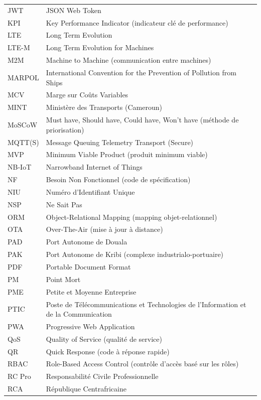 \begin{longtable}{@{}p{3.2cm}p{11.4cm}@{}}
	JWT & JSON Web Token \\
	KPI & Key Performance Indicator (indicateur clé de performance) \\
	LTE & Long Term Evolution \\
	LTE-M & Long Term Evolution for Machines \\
	M2M & Machine to Machine (communication entre machines) \\
	MARPOL & International Convention for the Prevention of Pollution from Ships \\
	MCV & Marge sur Coûts Variables \\
	MINT & Ministère des Transports (Cameroun) \\
	MoSCoW & Must have, Should have, Could have, Won't have (méthode de priorisation) \\
	MQTT(S) & Message Queuing Telemetry Transport (Secure) \\
	MVP & Minimum Viable Product (produit minimum viable) \\
	NB-IoT & Narrowband Internet of Things \\
	NF & Besoin Non Fonctionnel (code de spécification) \\
	NIU & Numéro d'Identifiant Unique \\
	NSP & Ne Sait Pas \\
	ORM & Object-Relational Mapping (mapping objet-relationnel) \\
	OTA & Over-The-Air (mise à jour à distance) \\
	PAD & Port Autonome de Douala \\
	PAK & Port Autonome de Kribi (complexe industrialo-portuaire) \\
	PDF & Portable Document Format \\
	PM & Point Mort \\
	PME & Petite et Moyenne Entreprise \\
	PTIC & Poste de Télécommunications et Technologies de l'Information et de la Communication \\
	PWA & Progressive Web Application \\
	QoS & Quality of Service (qualité de service) \\
	QR & Quick Response (code à réponse rapide) \\
	RBAC & Role-Based Access Control (contrôle d'accès basé sur les rôles) \\
	RC Pro & Responsabilité Civile Professionnelle \\
	RCA & République Centrafricaine \\

\end{longtable}
